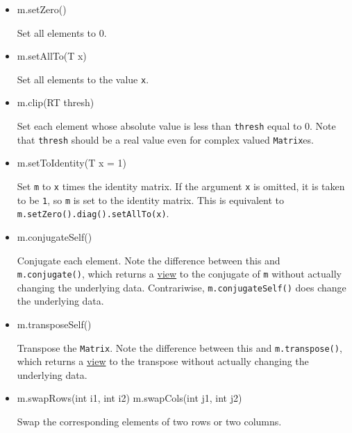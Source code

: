 \documentclass[twoside,letterpaper,11pt]{article}
\renewcommand{\tt}[1]{{\lstinline {#1}}}
\begin{document}
\begin{itemize}

\item
\begin{tmvcode}
m.setZero()
\end{tmvcode}
Set all elements to 0.

\item
\begin{tmvcode}
m.setAllTo(T x)
\end{tmvcode}
Set all elements to the value \tt{x}.

\item
\begin{tmvcode}
m.clip(RT thresh)
\end{tmvcode}
Set each element whose absolute value is less than \tt{thresh} equal to 0.
Note that \tt{thresh} should be a real value even for complex valued
\tt{Matrix}es.

\item
\begin{tmvcode}
m.setToIdentity(T x = 1)
\end{tmvcode}
Set \tt{m} to \tt{x} times the identity matrix.
If the argument \tt{x} is omitted, it is 
taken to be \tt{1}, so \tt{m} is set to the identity matrix.
This is equivalent to \tt{m.setZero().diag().setAllTo(x)}.

\item 
\begin{tmvcode}
m.conjugateSelf()
\end{tmvcode}
Conjugate each element.  Note the difference between this and \tt{m.conjugate()}, 
which returns a \underline{view} to the conjugate of \tt{m} without
actually changing the underlying data.  Contrariwise, \tt{m.conjugateSelf()}
does change the underlying data.

\item
\begin{tmvcode}
m.transposeSelf()
\end{tmvcode}
Transpose the \tt{Matrix}.  Note the difference between this and 
\tt{m.transpose()}, which returns a \underline{view} to the transpose without 
actually changing the underlying data.

\item
\begin{tmvcode}
m.swapRows(int i1, int i2)
m.swapCols(int j1, int j2)
\end{tmvcode}
Swap the corresponding elements of two rows or two columns.


\end{itemize}
\end{document}
